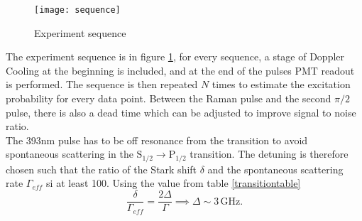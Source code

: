 \begin{figure}
\centering
\texttt{[image: sequence]}
\caption{Experiment sequence}
\label{sequence}
\end{figure}
The experiment sequence is in figure \ref{sequence}, for every sequence, a stage of Doppler Cooling at the beginning is included, and at the end of the pulses PMT readout is performed. The sequence is then repeated $N$ times to estimate the excitation probability for every data point. Between the Raman pulse and the second $\pi/2$ pulse, there is also a dead time which can be adjusted to improve signal to noise ratio.\\
The 393nm pulse has to be off resonance from the transition to avoid spontaneous scattering in the $\text{S}_{1/2}\to \text{P}_{1/2}$ transition. The detuning is therefore chosen such that the ratio of the Stark shift $\delta$ and the spontaneous scattering rate $\Gamma_{eff}$ si at least 100. Using the value from table \ref{transitiontable}
\begin{equation}
\frac{\delta}{\Gamma_{eff}} = \frac{2\Delta}{\Gamma} \implies \Delta \sim 3\,\text{GHz}.
\end{equation}
